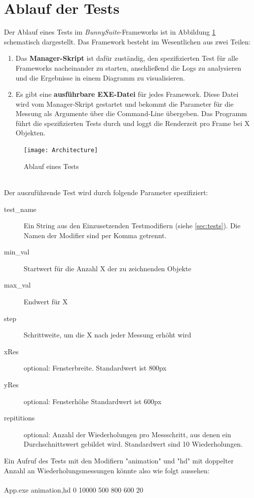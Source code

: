 \section{Ablauf der Tests}
Der Ablauf eines Tests im \textit{BunnySuite}-Frameworks ist in Abbildung \ref{dia:architecture} schematisch dargestellt. Das Framework besteht im Wesentlichen aus zwei Teilen:
\begin{enumerate}
\item Das \textbf{Manager-Skript} ist dafür zuständig, den spezifizierten Test für alle Frameworks nacheinander zu starten, anschließend die Logs zu analysieren und die Ergebnisse in einem Diagramm zu visualisieren.
\item Es gibt eine \textbf{ausführbare EXE-Datei} für jedes Framework. Diese Datei wird vom Manager-Skript gestartet und bekommt die Parameter für die Messung als Argumente über die Command-Line übergeben. Das Programm führt die spezifizierten Tests durch und loggt die Renderzeit pro Frame bei X Objekten.
\end{enumerate}
\begin{figure}[h]
\caption{Ablauf eines Tests}
\centering
\texttt{[image: Architecture]}
\label{dia:architecture}
\end{figure}
~\\
Der auszuführende Test wird durch folgende Parameter spezifiziert:\\
\begin{description}
\item[test\_name] Ein String aus den Einzusetzenden Testmodifiern (siehe \ref{sec:tests}). Die Namen der Modifier sind per Komma getrennt.
\item[min\_val] Startwert für die Anzahl X der zu zeichnenden Objekte
\item[max\_val] Endwert für X
\item[step] Schrittweite, um die X nach jeder Messung erhöht wird
\item[xRes] optional: Fensterbreite. Standardwert ist 800px
\item[yRes] optional: Fensterhöhe Standardwert ist 600px
\item[repititions] optional: Anzahl der Wiederholungen pro Messschritt, aus denen ein Durchschnittswert gebildet wird. Standardwert sind 10 Wiederholungen.
\end{description}
Ein Aufruf des Tests mit den Modifiern "animation" und "hd" mit doppelter Anzahl an Wiederholungsmessungen könnte also wie folgt aussehen:\\\\
App.exe animation,hd 0 10000 500 800 600 20

